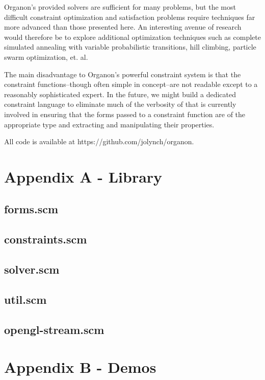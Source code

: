 \documentclass[12pt,a4paper]{article}
\begin{document}
Organon's provided solvers are sufficient for many problems, but the most difficult constraint optimization and satisfaction problems require techniques far more advanced than those presented here.  An interesting avenue of research would therefore be to explore additional optimization techniques such as complete simulated annealing with variable probabilistic transitions, hill climbing, particle swarm optimization, et. al.

The main disadvantage to Organon's powerful constraint system is that the constraint functions--though often simple in concept--are not readable except to a reasonably sophisticated expert. In the future, we might build a dedicated constraint language to eliminate much of the verbosity of that is currently involved in ensuring that the forms passed to a constraint function are of the appropriate type and extracting and manipulating their properties.

All code is available at https://github.com/jolynch/organon.

\appendix
\section{Appendix A - Library}\label{App:AppendixA}
\subsection{forms.scm}

\subsection{constraints.scm}

\subsection{solver.scm}

\subsection{util.scm}

\subsection{opengl-stream.scm}

\newpage

\section{Appendix B - Demos}\label{App:AppendixB}
\end{document}

